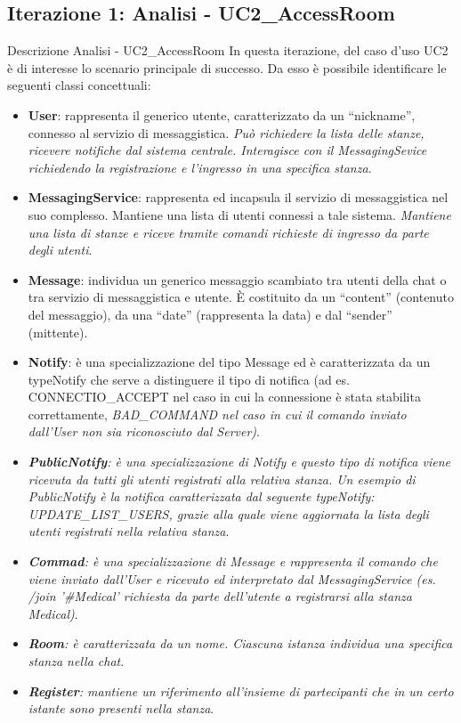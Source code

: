 \subsection{Iterazione 1: Analisi - UC2\_AccessRoom}
\begin{frame} [allowframebreaks] {Descrizione Analisi - UC2\_AccessRoom}
  In questa iterazione, del caso d’uso UC2 è di interesse lo scenario principale di successo.  Da esso è possibile identificare le seguenti classi concettuali: 
  \begin{itemize}
    \item \textbf{User}: rappresenta il generico utente, caratterizzato da un ``nickname'', connesso al servizio di messaggistica. \textit{Può richiedere la lista 
     delle stanze, ricevere notifiche dal sistema centrale. Interagisce con il MessagingSevice richiedendo la registrazione e l'ingresso in una specifica stanza}.
    \item \textbf{MessagingService}: rappresenta ed incapsula il servizio di messaggistica nel suo complesso. Mantiene una lista di utenti connessi a tale 
    sistema. \textit{Mantiene una lista di stanze e riceve tramite comandi richieste di ingresso da parte degli utenti}.
    \item \textbf{Message}: individua un generico messaggio scambiato tra utenti della chat o tra servizio di messaggistica e utente. È costituito da un ``content'' 
          (contenuto del messaggio), da una ``date'' (rappresenta la data) e dal ``sender'' (mittente).
    \item \textbf{Notify}: è una specializzazione del tipo Message ed è caratterizzata da un typeNotify che serve a distinguere il tipo di notifica (ad es. 
          CONNECTIO\_ACCEPT nel caso in cui la connessione è stata stabilita correttamente, \textit{BAD\_COMMAND nel caso in cui il comando inviato dall'User non 
          sia riconosciuto dal Server)}.
    \item \textit{\textbf{PublicNotify}: è una specializzazione di Notify e questo tipo di notifica viene ricevuta da tutti gli utenti registrati alla relativa 
          stanza. Un esempio di PublicNotify è la notifica caratterizzata dal seguente typeNotify: UPDATE\_LIST\_USERS, grazie alla quale viene 
          aggiornata la lista degli utenti registrati nella relativa stanza}.
   \item  \textit{\textbf{Commad}: è una specializzazione di Message e rappresenta il comando che viene inviato dall'User e ricevuto ed interpretato dal            
          MessagingService (es. /join '\#Medical' richiesta da parte dell'utente a registrarsi alla stanza Medical)}.        
    \item \textit{\textbf{Room}: è caratterizzata da un nome. Ciascuna istanza individua una specifica stanza nella chat}.
    \item \textit{\textbf{Register}: mantiene un riferimento all’insieme di partecipanti che in un certo istante sono presenti nella stanza}.
   \end{itemize}
\end{frame}

